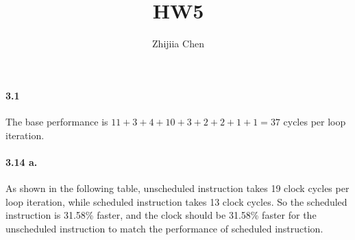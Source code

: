 \documentclass{article}
\title{HW5}
\author{Zhijiia Chen}
\begin{document}
\maketitle

\paragraph{3.1} The base performance is $11+3+4+10+3+2+2+1+1=37$ cycles per loop iteration.

\paragraph{3.14 a.} As shown in the following table, unscheduled instruction takes 19 clock cycles per loop iteration, while scheduled instruction takes 13 clock cycles. So the scheduled instruction is 31.58\% faster, and the clock should be 31.58\% faster for the unscheduled instruction to match the performance of scheduled instruction.
\end{document}
